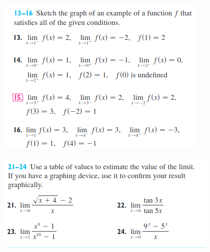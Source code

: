 \documentclass[spanish,12pt,a4paper]{article}
\begin{document}
\begin{itemize}
		
		\begin{figure}[h]
			
			\includegraphics[scale = 0.9]{estimacion_limite.png}\\
			
		\end{figure}
		
		\begin{figure}[h]
			\includegraphics[scale = 0.9]{tabla_limite.png}\\
		\end{figure}
		
	\end{itemize}
	
	
\end{document}
